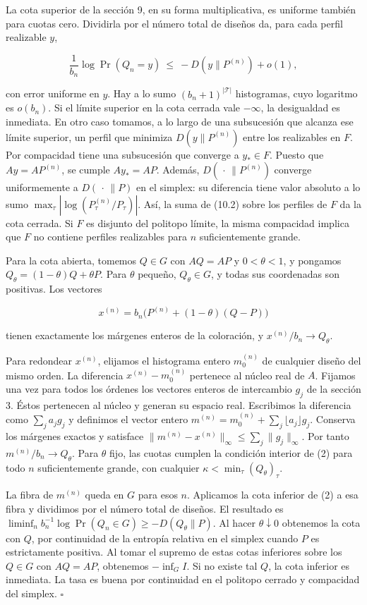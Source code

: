\documentclass[spanish,11pt,a4paper]{article}
\begin{document}
La cota superior de la sección 9, en su forma multiplicativa, es uniforme también para cuotas cero. Dividirla por el número total de diseños da, para cada perfil realizable \(y\),

\[\frac{1}{b_n}\log\Pr(Q_n=y)\ \le\ -D(y\|P^{(n)})+o(1),
\tag{10.2}\]

con error uniforme en \(y\). Hay a lo sumo \((b_n+1)^{|\mathcal T|}\) histogramas, cuyo logaritmo es \(o(b_n)\). Si el límite superior en la cota cerrada vale \(-\infty\), la desigualdad es inmediata. En otro caso tomamos, a lo largo de una subsucesión que alcanza ese límite superior, un perfil que minimiza \(D(y\|P^{(n)})\) entre los realizables en \(F\). Por compacidad tiene una subsucesión que converge a \(y_*\in F\). Puesto que \(Ay=AP^{(n)}\), se cumple \(Ay_*=AP\). Además, \(D(\,\cdot\,\|P^{(n)})\) converge uniformemente a \(D(\,\cdot\,\|P)\) en el simplex: su diferencia tiene valor absoluto a lo sumo \(\max_\tau|\log(P^{(n)}_\tau/P_\tau)|\). Así, la suma de (10.2) sobre los perfiles de \(F\) da la cota cerrada. Si \(F\) es disjunto del politopo límite, la misma compacidad implica que \(F\) no contiene perfiles realizables para \(n\) suficientemente grande.

Para la cota abierta, tomemos \(Q\in G\) con \(AQ=AP\) y \(0<\theta<1\), y pongamos \(Q_\theta=(1-\theta)Q+\theta P\). Para \(\theta\) pequeño, \(Q_\theta\in G\), y todas sus coordenadas son positivas. Los vectores

\[x^{(n)}=b_n\bigl(P^{(n)}+(1-\theta)(Q-P)\bigr)\]

tienen exactamente los márgenes enteros de la coloración, y \(x^{(n)}/b_n\to Q_\theta\).

Para redondear \(x^{(n)}\), elijamos el histograma entero \(m^{(n)}_0\) de cualquier diseño del mismo orden. La diferencia \(x^{(n)}-m^{(n)}_0\) pertenece al núcleo real de \(A\). Fijamos una vez para todos los órdenes los vectores enteros de intercambio \(g_j\) de la sección 3. Éstos pertenecen al núcleo y generan su espacio real. Escribimos la diferencia como \(\sum_j a_j g_j\) y definimos el vector entero \(m^{(n)}=m^{(n)}_0+\sum_j\lfloor a_j\rfloor g_j\). Conserva los márgenes exactos y satisface \(\|m^{(n)}-x^{(n)}\|_\infty\le\sum_j\|g_j\|_\infty\). Por tanto \(m^{(n)}/b_n\to Q_\theta\). Para \(\theta\) fijo, las cuotas cumplen la condición interior de (2) para todo \(n\) suficientemente grande, con cualquier \(\kappa<\min_\tau(Q_\theta)_\tau\).

La fibra de \(m^{(n)}\) queda en \(G\) para esos \(n\). Aplicamos la cota inferior de (2) a esa fibra y dividimos por el número total de diseños. El resultado es \(\liminf_n b_n^{-1}\log\Pr(Q_n\in G)\ge-D(Q_\theta\|P)\). Al hacer \(\theta\downarrow0\) obtenemos la cota con \(Q\), por continuidad de la entropía relativa en el simplex cuando \(P\) es estrictamente positiva. Al tomar el supremo de estas cotas inferiores sobre los \(Q\in G\) con \(AQ=AP\), obtenemos \(-\inf_G I\). Si no existe tal \(Q\), la cota inferior es inmediata. La tasa es buena por continuidad en el politopo cerrado y compacidad del simplex. \(\square\)
\end{document}
